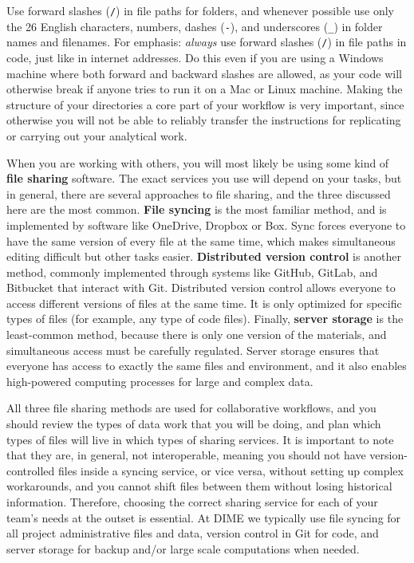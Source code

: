 Use forward slashes (\texttt{/}) in file paths for folders,
and whenever possible use only the 26 English characters, numbers,
dashes (\texttt{-}), and underscores (\texttt{\_}) in folder names and filenames.
For emphasis: \textit{always} use forward slashes (\texttt{/})
in file paths in code, just like in internet addresses.
Do this even if you are using a Windows machine where
both forward and backward slashes are allowed,
as your code will otherwise break
if anyone tries to run it on a Mac or Linux machine.
Making the structure of your directories a core part of your workflow is very important,
since otherwise you will not be able to reliably transfer the instructions
for replicating or carrying out your analytical work.

When you are working with others, you will most likely be using
some kind of \textbf{file sharing} software.
The exact services you use will depend on your tasks,
but in general, there are several approaches to file sharing,
and the three discussed here are the most common.
\textbf{File syncing} is the most familiar method,
and is implemented by software like OneDrive, Dropbox or Box.
Sync forces everyone to have the same version of every file at the same time,
which makes simultaneous editing difficult but other tasks easier.
\textbf{Distributed version control} is another method,
commonly implemented through systems like GitHub, GitLab, and Bitbucket
that interact with Git.
Distributed version control allows everyone
to access different versions of files at the same time.
It is only optimized for specific types of files
(for example, any type of code files).
Finally, \textbf{server storage} is the least-common method,
because there is only one version of the materials,
and simultaneous access must be carefully regulated.
Server storage ensures that everyone has access
to exactly the same files and environment, and it also enables
high-powered computing processes for large and complex data.

All three file sharing methods are used for collaborative workflows,
and you should review the types of data work
that you will be doing, and plan which types of files
will live in which types of sharing services.
It is important to note that they are, in general, not interoperable,
meaning you should not have version-controlled files inside a syncing service,
or vice versa, without setting up complex workarounds,
and you cannot shift files between them without losing historical information.
Therefore, choosing the correct sharing service for each of your team's needs at the outset is essential.
At DIME we typically use file syncing for all project administrative files and data,
version control in Git for code,
and server storage for backup and/or large scale computations when needed.

